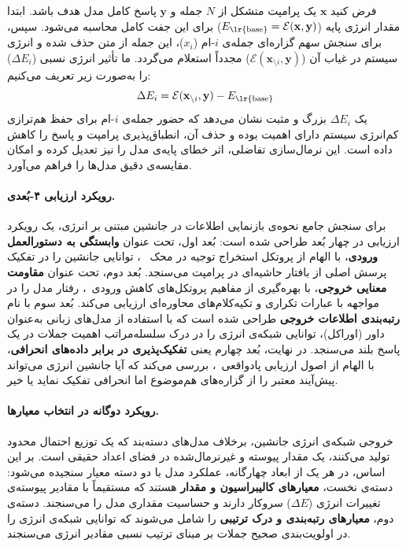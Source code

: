 فرض کنید $\mathbf{x}$ یک پرامپت متشکل از $N$ جمله و $\mathbf{y}$ پاسخ کامل مدل هدف باشد. ابتدا مقدار انرژی پایه ($E_{\text{\lr{base}}} = \mathcal{E}(\mathbf{x}, \mathbf{y})$) برای این جفت کامل محاسبه می‌شود. سپس، برای سنجش سهم گزاره‌ای جمله‌ی $i$-ام ($x_i$)، این جمله از متن حذف شده و انرژی سیستم در غیاب آن ($\mathcal{E}(\mathbf{x}_{\setminus i}, \mathbf{y})$) مجدداً استعلام می‌گردد. ما تأثیر انرژی نسبی ($\Delta E_i$) را به‌صورت زیر تعریف می‌کنیم:
\begin{equation}
    \Delta E_i = \mathcal{E}(\mathbf{x}_{\setminus i}, \mathbf{y}) - E_{\text{\lr{base}}} \label{eq:chap5_relative_energy}
\end{equation}
یک $\Delta E_i$ بزرگ و مثبت نشان می‌دهد که حضور جمله‌ی $i$-ام برای حفظ هم‌ترازی کم‌انرژی سیستم دارای اهمیت بوده و حذف آن، انطباق‌پذیری پرامپت و پاسخ را کاهش داده است. این نرمال‌سازی تفاضلی، اثر خطای پایه‌ی مدل را نیز تعدیل کرده و امکان مقایسه‌ی دقیق مدل‌ها را فراهم می‌آورد.

\paragraph{رویکرد ارزیابی ۴-بُعدی.}
برای سنجش جامع نحوه‌ی بازنمایی اطلاعات در جانشین مبتنی بر انرژی، یک رویکرد ارزیابی در چهار بُعد طراحی شده است:
بُعد اول، تحت عنوان \textbf{وابستگی به دستورالعمل ورودی}، با الهام از پروتکل استخراج توجیه در محک ~\cite{deyoung2020eraser}، توانایی جانشین را در تفکیک پرسش اصلی از بافتار حاشیه‌ای در پرامپت می‌سنجد. 
بُعد دوم، تحت عنوان \textbf{مقاومت معنایی خروجی}، با بهره‌گیری از مفاهیم پروتکل‌های کاهش ورودی~\cite{feng2018pathologies}، رفتار مدل را در مواجهه با عبارات تکراری و تکیه‌کلام‌های محاوره‌ای ارزیابی می‌کند.
بُعد سوم با نام \textbf{رتبه‌بندی اطلاعات خروجی} طراحی شده است که با استفاده از مدل‌های زبانی به‌عنوان داور (اوراکل)، توانایی شبکه‌ی انرژی را در درک سلسله‌مراتب اهمیت جملات در یک پاسخ بلند می‌سنجد. 
در نهایت، بُعد چهارم یعنی \textbf{تفکیک‌پذیری در برابر داده‌های انحرافی}، با الهام از اصول ارزیابی پادواقعی~\cite{kaushik2020learning}، بررسی می‌کند که آیا جانشین انرژی می‌تواند پیش‌آیند معتبر را از گزاره‌های هم‌موضوع اما انحرافی تفکیک نماید یا خیر.

\paragraph{رویکرد دوگانه در انتخاب معیارها.}
خروجی شبکه‌ی انرژی جانشین، برخلاف مدل‌های دسته‌بند که یک توزیع احتمال محدود تولید می‌کنند، یک مقدار پیوسته و غیرنرمال‌شده در فضای اعداد حقیقی است. بر این اساس، در هر یک از ابعاد چهارگانه، عملکرد مدل با دو دسته معیار سنجیده می‌شود:
دسته‌ی نخست، \textbf{معیارهای کالیبراسیون و مقدار} هستند که مستقیماً با مقادیر پیوسته‌ی تغییرات انرژی ($\Delta E$) سروکار دارند و حساسیت مقداری مدل را می‌سنجند.
دسته‌ی دوم، \textbf{معیارهای رتبه‌بندی و درک ترتیبی} را شامل می‌شوند که توانایی شبکه‌ی انرژی را در اولویت‌بندی صحیح جملات بر مبنای ترتیب نسبی مقادیر انرژی می‌سنجند.

